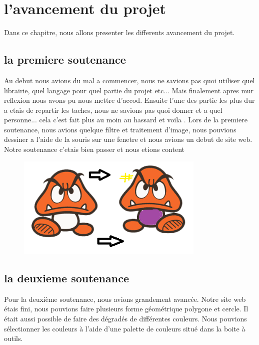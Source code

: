 \documentclass[12pt, a4paper]{report}
\begin{document}
\newpage


\chapter{l'avancement du projet}

Dans ce chapitre, nous allons presenter les differents avancement du projet.

\section {la premiere soutenance }

Au debut nous avions du mal a commencer, nous ne savions pas quoi utiliser quel librairie, quel langage pour quel partie du projet etc... Mais finalement apres mur reflexion nous avons pu nous mettre d'accod. 
Ensuite l'une des partie les plus dur a etais de repartir les taches, nous ne savions pas quoi donner et a quel personne... cela c'est fait plus au moin au hassard et voila .
Lors de la premiere soutenance, nous avions quelque filtre et traitement d'image, nous pouvions dessiner a l'aide de la souris sur une fenetre et nous avions un debut de site web.
Notre soutenance c'etais bien passer et nous etions content 


\begin{figure}[!h]
\begin{center} \includegraphics[width=0.8\textwidth]{images/goouni.png} \end{center}
\end{figure}


\newpage 


\section {la deuxieme soutenance}


Pour la deuxième soutenance, nous avions grandement avancée. 
Notre site web étais fini, nous pouvions faire plusieurs forme géométrique polygone et cercle. Il était aussi possible de faire des dégradés de différentes couleurs. Nous pouvions sélectionner les couleurs à l'aide d'une palette de couleurs  situé dans la boite à outils.
\end{document}
